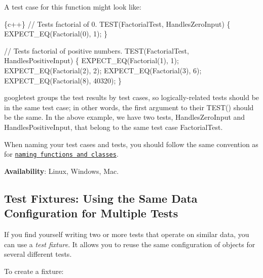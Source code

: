 A test case for this function might look like\+:


\begin{DoxyCode}
\{c++\}
// Tests factorial of 0.
TEST(FactorialTest, HandlesZeroInput) \{
  EXPECT\_EQ(Factorial(0), 1);
\}

// Tests factorial of positive numbers.
TEST(FactorialTest, HandlesPositiveInput) \{
  EXPECT\_EQ(Factorial(1), 1);
  EXPECT\_EQ(Factorial(2), 2);
  EXPECT\_EQ(Factorial(3), 6);
  EXPECT\_EQ(Factorial(8), 40320);
\}
\end{DoxyCode}


googletest groups the test results by test cases, so logically-\/related tests should be in the same test case; in other words, the first argument to their {\ttfamily T\+E\+S\+T()} should be the same. In the above example, we have two tests, {\ttfamily Handles\+Zero\+Input} and {\ttfamily Handles\+Positive\+Input}, that belong to the same test case {\ttfamily Factorial\+Test}.

When naming your test cases and tests, you should follow the same convention as for \href{https://google.github.io/styleguide/cppguide.html#Function_Names}{\tt naming functions and classes}.

{\bfseries Availability}\+: Linux, Windows, Mac.

\subsection*{Test Fixtures\+: Using the Same Data Configuration for Multiple Tests}

If you find yourself writing two or more tests that operate on similar data, you can use a {\itshape test fixture}. It allows you to reuse the same configuration of objects for several different tests.

To create a fixture\+:


